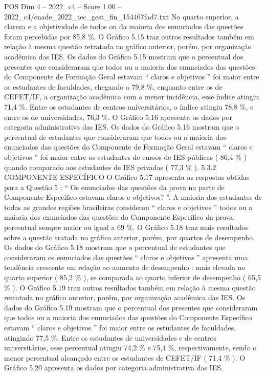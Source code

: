 \begin{textsample}{POS Dim 4 – 2022\_c4 – Score 1.00 – 2022\_c4/enade\_2022\_tec\_gest\_fin\_154467fad7.txt}
No quarto superior, a clareza e a objetividade de todos ou da maioria dos enunciados das questões foram percebidas por 85,8 \%.
O Gráfico 5.15 traz outros resultados também em relação à mesma questão retratada no gráfico anterior, porém, por organização acadêmica das IES.
Os dados do Gráfico 5.15 mostram que o percentual dos presentes que consideraram que todos ou a maioria dos enunciados das questões do Componente de Formação Geral estavam “ claros e objetivos ” foi maior entre os estudantes de faculdades, chegando a 79,8 \%, enquanto entre os de CEFET/IF, a organização acadêmica com a menor incidência, esse índice atingiu 71,4 \%.
Entre os estudantes de centros universitários, o índice atingiu 78,8 \%, e entre os de universidades, 76,3 \%.
O Gráfico 5.16 apresenta os dados por categoria administrativa das IES.
Os dados do Gráfico 5.16 mostram que o percentual de estudantes que consideraram que todos ou a maioria dos enunciados das questões do Componente de Formação Geral estavam “ claros e objetivos ” foi maior entre os estudantes de cursos de IES públicas ( 86,4 \% ) quando comparado aos estudantes de IES privadas ( 77,3 \% ). 5.3.2 COMPONENTE ESPECÍFICO O Gráfico 5.17 apresenta as respostas obtidas para a Questão 5 : “ Os enunciados das questões da prova na parte de Componente Específico estavam claros e objetivos? ”.
A maioria dos estudantes de todas as grandes regiões brasileiras considerou “ claros e objetivos ” todos ou a maioria dos enunciados das questões do Componente Específico da prova, percentual sempre maior ou igual a 69 \%.
O Gráfico 5.18 traz mais resultados sobre a questão tratada no gráfico anterior, porém, por quartos de desempenho.
Os dados do Gráfico 5.18 mostram que o percentual de estudantes que consideraram os enunciados das questões “ claros e objetivos ” apresenta uma tendência crescente em relação ao aumento de desempenho : mais elevada no quarto superior ( 85,2 \% ), se comparada ao quarto inferior de desempenho ( 65,5 \% ).
O Gráfico 5.19 traz outros resultados também em relação à mesma questão retratada no gráfico anterior, porém, por organização acadêmica das IES.
Os dados do Gráfico 5.19 mostram que o percentual dos presentes que consideraram que todos ou a maioria dos enunciados das questões do Componente Específico estavam “ claros e objetivos ” foi maior entre os estudantes de faculdades, atingindo 77,5 \%.
Entre os estudantes de universidades e de centros universitários, esse percentual atingiu 74,2 \% e 75,4 \%, respectivamente, sendo o menor percentual alcançado entre os estudantes de CEFET/IF ( 71,4 \% ).
O Gráfico 5.20 apresenta os dados por categoria administrativa das IES.

\end{textsample}
